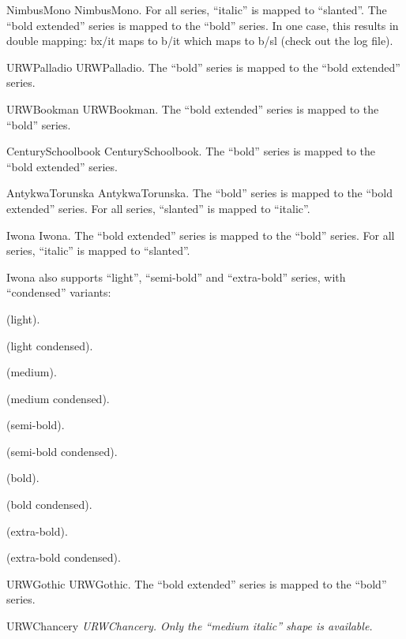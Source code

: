 \nextfamily NimbusMono
NimbusMono.  For all series, ``italic'' is mapped to ``slanted''.  The
``bold extended'' series is mapped to the ``bold'' series.  In one
case, this results in double mapping:  bx/it maps to b/it which maps
to b/sl (check out the log file).
\nextsize 1pc

\nextfamily URWPalladio
URWPalladio.  The ``bold'' series is mapped to the ``bold extended''
series.
\nextsize 1pc

\nextfamily URWBookman
URWBookman.  The ``bold extended'' series is mapped to the ``bold''
series.
\nextsize 1pc

\nextfamily CenturySchoolbook
CenturySchoolbook.  The ``bold'' series is mapped to the ``bold
extended'' series.
\nextsize 1pc

\nextfamily AntykwaTorunska
AntykwaTorunska.  The ``bold'' series is mapped to the ``bold
extended'' series.  For all series, ``slanted'' is mapped to
``italic''.
\nextsize 1pc



\nextfamily Iwona
Iwona.  The ``bold extended'' series is mapped to the ``bold'' series.
For all series, ``italic'' is mapped to ``slanted''.
\nextsize 1pc

\vskip 1pc
\setfontsize{10pt}\selectfont
Iwona also supports ``light'', ``semi-bold'' and ``extra-bold''
series, with ``condensed'' variants:

\def\\#1{\setfontseries{#1}\selectfont\teststring}

\\{l} (light).\par
\\{lc} (light condensed).

\\{m} (medium).\par
\\{c} (medium condensed).

\\{sb} (semi-bold).\par
\\{sbc} (semi-bold condensed).

\\{b} (bold).\par
\\{bc} (bold condensed).

\\{eb} (extra-bold).\par
\\{ebc} (extra-bold condensed).



\nextfamily URWGothic
URWGothic.  The ``bold extended'' series is mapped to the ``bold''
series.
\nextsize 1pc

\nextfamily URWChancery
\itshape
URWChancery.  Only the ``medium italic'' shape is available.
\nextsize 1pc

\bye

